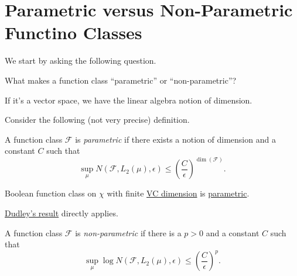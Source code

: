\section{Parametric versus Non-Parametric Functino Classes}
We start by asking the following question.

\begin{problem*}
	What makes a function class ``parametric'' or ``non-parametric''?
\end{problem*}
\begin{answer}
	If it's a vector space, we have the linear algebra notion of dimension.
\end{answer}

Consider the following (not very precise) definition.

\begin{definition}[Parametric]\label{def:parametric}
	A function class \(\mathscr{F} \) is \emph{parametric} if there exists a notion of dimension and a constant \(C\) such that
	\[
		\sup _\mu N(\mathscr{F} , L_2(\mu ), \epsilon ) \leq \left( \frac{C}{\epsilon } \right) ^{\dim(\mathscr{F} )}.
	\]
\end{definition}

\begin{eg}
	Boolean function class on \(\chi \) with finite \hyperref[def:VC-dimension]{VC dimension} is \hyperref[def:parametric]{parametric}.
\end{eg}
\begin{explanation}
	\hyperref[thm:Dudley]{Dudley's result} directly applies.
\end{explanation}

\begin{definition}\label{def:non-parametric}
	A function class \(\mathscr{F} \) is \emph{non-parametric} if there is a \(p > 0\) and a constant \(C\) such that
	\[
		\sup _\mu \log N(\mathscr{F} , L_2(\mu ), \epsilon ) \leq \left( \frac{C}{\epsilon } \right) ^p.
	\]
\end{definition}

